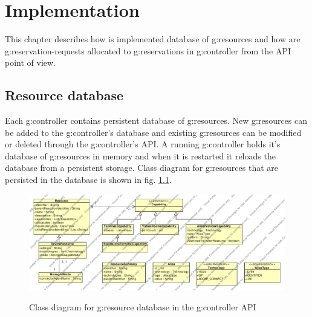 \chapter{Implementation}



This chapter describes how is implemented database of \glspl{g:resource} and how are \glspl{g:reservation-request} allocated to \glspl{g:reservation} in \gls{g:controller} from the API point of view.

\section{Resource database}

Each \gls{g:controller} contains persistent database of \glspl{g:resource}. New \glspl{g:resource} can be added to the \gls{g:controller}'s database and existing \glspl{g:resource} can be modified or deleted through the \gls{g:controller}'s API. A running \gls{g:controller} holds it's database of \glspl{g:resource} in memory and when it is restarted it reloads the database from a persistent storage. Class diagram for \glspl{g:resource} that are persisted in the database is shown in fig. \ref{fig:cd_api_resources}.

\begin{figure}[ht!]
\includegraphics[width=\textwidth]{diagrams/cd_api_resources}
\label{fig:cd_api_resources}
\caption{Class diagram for \gls{g:resource} database in the \gls{g:controller} API}
\end{figure}

